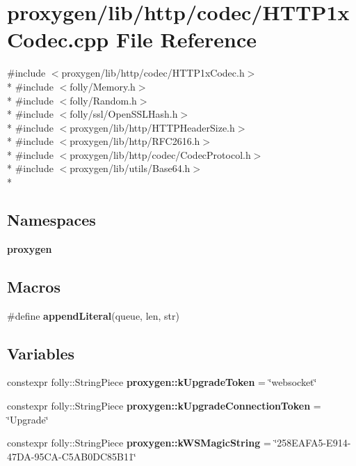 \section{proxygen/lib/http/codec/\+H\+T\+T\+P1x\+Codec.cpp File Reference}
\label{HTTP1xCodec_8cpp}
{\ttfamily \#include $<$proxygen/lib/http/codec/\+H\+T\+T\+P1x\+Codec.\+h$>$}\\*
{\ttfamily \#include $<$folly/\+Memory.\+h$>$}\\*
{\ttfamily \#include $<$folly/\+Random.\+h$>$}\\*
{\ttfamily \#include $<$folly/ssl/\+Open\+S\+S\+L\+Hash.\+h$>$}\\*
{\ttfamily \#include $<$proxygen/lib/http/\+H\+T\+T\+P\+Header\+Size.\+h$>$}\\*
{\ttfamily \#include $<$proxygen/lib/http/\+R\+F\+C2616.\+h$>$}\\*
{\ttfamily \#include $<$proxygen/lib/http/codec/\+Codec\+Protocol.\+h$>$}\\*
{\ttfamily \#include $<$proxygen/lib/utils/\+Base64.\+h$>$}\\*
\subsection*{Namespaces}
\begin{DoxyCompactItemize}
\item 
 {\bf proxygen}
\end{DoxyCompactItemize}
\subsection*{Macros}
\begin{DoxyCompactItemize}
\item 
\#define {\bf append\+Literal}(queue,  len,  str)
\end{DoxyCompactItemize}
\subsection*{Variables}
\begin{DoxyCompactItemize}
\item 
constexpr folly\+::\+String\+Piece {\bf proxygen\+::k\+Upgrade\+Token} = \char`\"{}websocket\char`\"{}
\item 
constexpr folly\+::\+String\+Piece {\bf proxygen\+::k\+Upgrade\+Connection\+Token} = \char`\"{}Upgrade\char`\"{}
\item 
constexpr folly\+::\+String\+Piece {\bf proxygen\+::k\+W\+S\+Magic\+String} = \char`\"{}258\+E\+A\+F\+A5-\/\+E914-\/47\+D\+A-\/95\+C\+A-\/\+C5\+A\+B0\+D\+C85\+B11\char`\"{}
\end{DoxyCompactItemize}


